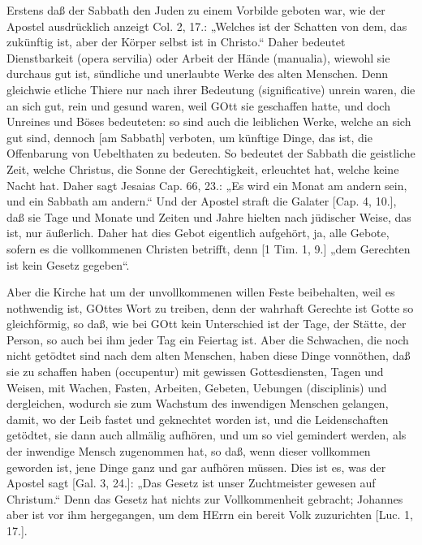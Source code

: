 Erstens daß der Sabbath den Juden zu einem Vorbilde geboten war, wie der Apostel ausdrücklich anzeigt Col. 2, 17.: „Welches ist der Schatten von dem, das zukünftig ist, aber der Körper selbst ist in Christo.“ Daher bedeutet Dienstbarkeit (opera servilia) oder Arbeit der Hände (manualia), wiewohl sie durchaus gut ist, sündliche und unerlaubte Werke des alten Menschen. Denn gleichwie etliche Thiere nur nach ihrer Bedeutung (significative) unrein waren, die an sich gut, rein und gesund waren, weil GOtt sie geschaffen hatte, und doch Unreines und Böses bedeuteten: so sind auch die leiblichen Werke, welche an sich gut sind, dennoch [am Sabbath] verboten, um künftige Dinge, das ist, die Offenbarung von Uebelthaten zu bedeuten. So bedeutet der Sabbath die geistliche Zeit, welche Christus, die Sonne der Gerechtigkeit, erleuchtet hat, welche keine Nacht hat. Daher sagt Jesaias Cap. 66, 23.: „Es wird ein Monat am andern sein, und ein Sabbath am andern.“ Und der Apostel straft die Galater [Cap. 4, 10.], daß sie Tage und Monate und Zeiten und Jahre hielten nach jüdischer Weise, das ist, nur äußerlich. Daher hat dies Gebot eigentlich aufgehört, ja, alle Gebote, sofern es die vollkommenen Christen betrifft, denn [1 Tim. 1, 9.] „dem Gerechten ist kein Gesetz gegeben“.

Aber die Kirche hat um der unvollkommenen willen Feste beibehalten, weil es nothwendig ist, GOttes Wort zu treiben, denn der wahrhaft Gerechte ist Gotte so gleichförmig, so daß, wie bei GOtt kein Unterschied ist der Tage, der Stätte, der Person, so auch bei ihm jeder Tag ein Feiertag ist. Aber die Schwachen, die noch nicht getödtet sind nach dem alten Menschen, haben diese Dinge vonnöthen, daß sie zu schaffen haben (occupentur) mit gewissen Gottesdiensten, Tagen und Weisen, mit Wachen, Fasten, Arbeiten, Gebeten, Uebungen (disciplinis) und dergleichen, wodurch sie zum Wachstum des inwendigen Menschen gelangen, damit, wo der Leib fastet und geknechtet worden ist, und die Leidenschaften getödtet, sie dann auch allmälig aufhören, und um so viel gemindert werden, als der inwendige Mensch zugenommen hat, so daß, wenn dieser vollkommen geworden ist, jene Dinge ganz und gar aufhören müssen. Dies ist es, was der Apostel sagt [Gal. 3, 24.]: „Das Gesetz ist unser Zuchtmeister gewesen auf Christum.“ Denn das Gesetz hat nichts zur Vollkommenheit gebracht; Johannes aber ist vor ihm hergegangen, um dem HErrn ein bereit Volk zuzurichten [Luc. 1, 17.].

